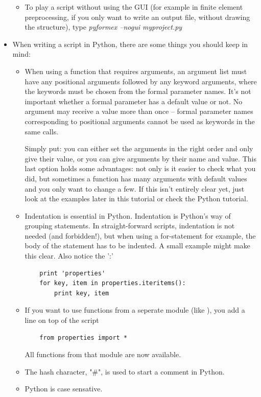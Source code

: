 \begin{itemize}
\begin{itemize}
	\item To play a script without using the GUI (for example in finite element preprocessing, if you only want to write an 		output file, without drawing the structure), type \emph{pyformex --nogui myproject.py}
	\end{itemize}
\item When writing a script in Python, there are some things you should keep in mind:
	\begin{itemize}
	\item When using a function that requires arguments, an argument list must have any positional arguments followed by any keyword arguments, where the keywords must be chosen from the formal parameter names. It's not important whether a formal parameter has a default value or not. No argument may receive a value more than once -- formal parameter names corresponding to positional arguments cannot be used as keywords in the same calls. 

Simply put: you can either set the arguments in the right order and only give their value, or you can give arguments by their name and value. This last option holds some advantages: not only is it easier to check what you did, but sometimes a function has many arguments with default values and you only want to change a few.
If this isn't entirely clear yet, just look at the examples later in this tutorial or check the Python tutorial.
	\item Indentation is essential in Python. Indentation is Python's way of grouping statements. In straight-forward scripts, indentation is not needed (and forbidden!), but when using a for-statement for example, the body of the statement has to be indented. A small example might make this clear. Also notice the ':' 
\begin{verbatim}
	print 'properties'
	for key, item in properties.iteritems():
	    print key, item
\end{verbatim}
	\item If you want to use functions from a seperate module (like ), you add a line on top of the script
\begin{verbatim}
	from properties import *
\end{verbatim}
All functions from that module are now available.
	\item The hash character, "\#", is used to start a comment in Python.
	\item Python is case sensative.
	\end{itemize}
\end{itemize}


